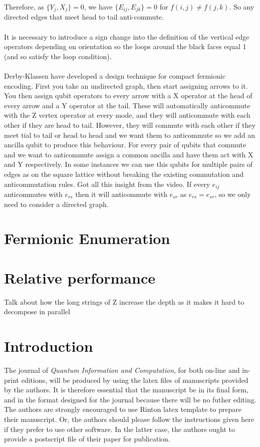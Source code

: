 \documentclass[twoside]{article}
\begin{document}
Therefore, as $\{Y_j, X_j\} = 0$, we have $\{E_{ij}, E_{jk}\} = 0$ for $f(i,j) \neq f(j,k)$. So any directed edges that meet head to tail anti-commute.
\\\\
        It is necessary to introduce a sign change into the definition of the vertical edge operators depending on orientation so the loops around the black faces equal 1 (and so satisfy the loop condition). \\\\
        Derby-Klassen have developed a design technique for compact fermionic encoding. First you take an undirected graph, then start assigning arrows to it. You then assign qubit operators to every arrow with a X operator at the head of every arrow and a Y operator at the tail. These will automatically anticommute with the Z vertex operator at every mode, and they will anticommute with each other if they are head to tail. However, they will commute with each other if they meet tial to tail or head to head and we want them to anticommute so we add an ancilla qubit to produce this behaviour. For every pair of qubits that commute and we want to anticommute assign a common ancilla and have them act with X and Y respectively. In some instances we can use this qubits for multiple pairs of edges as on the square lattice without breaking the existing commutation and anticommutation rules. Got all this insight from the video. If every $e_{ij}$ anticommutes with $e_{rs}$ then it will anticommute with $e_{sr}$ as $e_{rs} = e_{sr}$, so we only need to consider a directed graph.

        \section{Fermionic Enumeration}\label{fermionic-enumeration_section}
\section{Relative performance}\label{comparision_section}
Talk about how the long strings of Z increase the depth as it makes it hard to decompose in parallel



        \pagebreak
\section{Introduction}        
The journal of {\it Quantum Information and Computation},
for both on-line and in-print editions,
will be produced by using the latex files of manuscripts
provided by the authors. It is therefore essential that the manuscript 
be in its final form, and in the format designed for the journal 
because there will be no futher editing. The authors are strongly encouraged 
to use Rinton latex template to prepare their manuscript. Or, the authors 
should please follow the instructions given here if they prefer to use other 
software. In the latter case, the authors ought to
provide a postscript file of their paper for publication.
\end{document}
